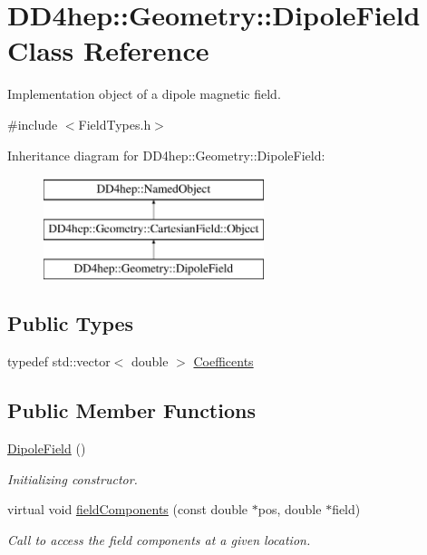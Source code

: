 \hypertarget{class_d_d4hep_1_1_geometry_1_1_dipole_field}{}\section{D\+D4hep\+:\+:Geometry\+:\+:Dipole\+Field Class Reference}
\label{class_d_d4hep_1_1_geometry_1_1_dipole_field}


Implementation object of a dipole magnetic field.  




{\ttfamily \#include $<$Field\+Types.\+h$>$}

Inheritance diagram for D\+D4hep\+:\+:Geometry\+:\+:Dipole\+Field\+:\begin{figure}[H]
\begin{center}
\leavevmode
\includegraphics[height=3.000000cm]{class_d_d4hep_1_1_geometry_1_1_dipole_field}
\end{center}
\end{figure}
\subsection*{Public Types}
\begin{DoxyCompactItemize}
\item 
typedef std\+::vector$<$ double $>$ \hyperlink{class_d_d4hep_1_1_geometry_1_1_dipole_field_a0e17be76b199f0f144624e6a5eb1f030}{Coefficents}
\end{DoxyCompactItemize}
\subsection*{Public Member Functions}
\begin{DoxyCompactItemize}
\item 
\hyperlink{class_d_d4hep_1_1_geometry_1_1_dipole_field_a7a431d40e83bd52565fccf2ed507780e}{Dipole\+Field} ()
\begin{DoxyCompactList}\small\item\em Initializing constructor. \end{DoxyCompactList}\item 
virtual void \hyperlink{class_d_d4hep_1_1_geometry_1_1_dipole_field_afee57d23345cdd6a457475d8fe6ac4a7}{field\+Components} (const double $\ast$pos, double $\ast$field)
\begin{DoxyCompactList}\small\item\em Call to access the field components at a given location. \end{DoxyCompactList}\end{DoxyCompactItemize}
